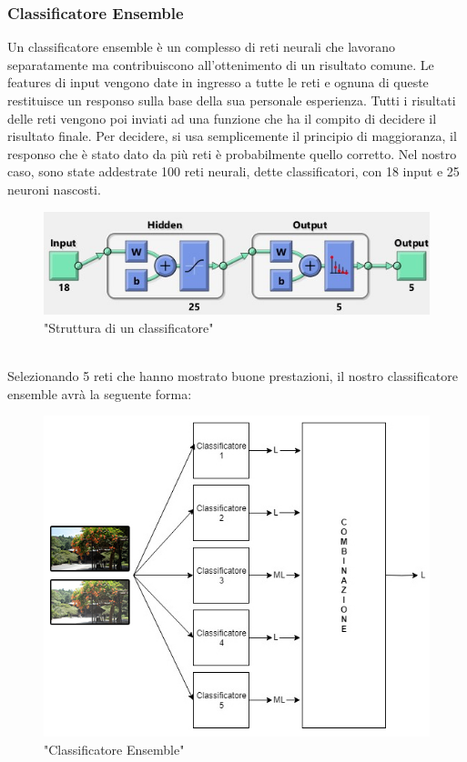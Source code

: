 \documentclass[a4paper,11pt]{article}
\begin{document}
    \subsubsection{Classificatore Ensemble}
    Un classificatore ensemble  è un complesso di reti neurali che lavorano separatamente ma contribuiscono all'ottenimento di un risultato comune.
    Le features di input vengono date in ingresso a tutte le reti e ognuna di queste restituisce un responso sulla base della sua personale esperienza. Tutti i risultati delle reti vengono poi inviati ad una funzione che ha il compito di decidere il risultato finale.
    Per decidere, si usa semplicemente il principio di maggioranza, il responso che è stato dato da più reti è probabilmente quello corretto.
    Nel nostro caso, sono state addestrate 100 reti neurali, dette classificatori, con 18 input e 25 neuroni nascosti. 
    \begin{figure}[h]
        \centering
        \includegraphics[scale=0.9]{strutturaRete2}
        \caption{"Struttura di un classificatore"}
    \end{figure}
    \\Selezionando 5 reti che hanno mostrato buone prestazioni, il nostro classificatore ensemble avrà la seguente forma:
    \begin{figure}[h]
        \centering
        \includegraphics[scale=0.55]{classifier}
        \caption{"Classificatore Ensemble"}
    \end{figure}
\end{document}
